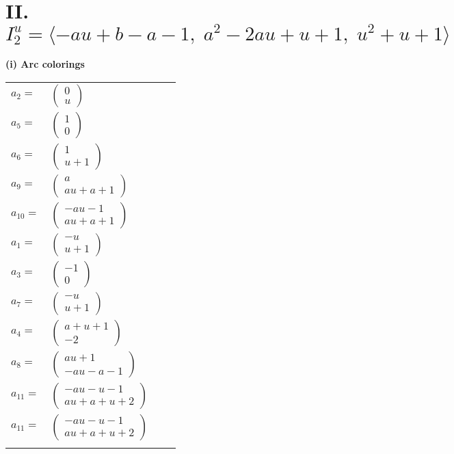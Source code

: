 \documentclass[1p]{elsarticle_modified}
\theoremstyle{definition}
\begin{document}
\centering \section*{II. $I^u_{2}= \langle - a u+b- a-1,\;a^2-2 a u+u+1,\;u^2+u+1 \rangle$}
\flushleft \textbf{(i) Arc colorings}\\
\begin{tabular}{m{7pt} m{180pt} m{7pt} m{180pt} }
\flushright $a_{2}=$&$\begin{pmatrix}0\\u\end{pmatrix}$ \\
\flushright $a_{5}=$&$\begin{pmatrix}1\\0\end{pmatrix}$ \\
\flushright $a_{6}=$&$\begin{pmatrix}1\\u+1\end{pmatrix}$ \\
\flushright $a_{9}=$&$\begin{pmatrix}a\\a u+a+1\end{pmatrix}$ \\
\flushright $a_{10}=$&$\begin{pmatrix}- a u-1\\a u+a+1\end{pmatrix}$ \\
\flushright $a_{1}=$&$\begin{pmatrix}- u\\u+1\end{pmatrix}$ \\
\flushright $a_{3}=$&$\begin{pmatrix}-1\\0\end{pmatrix}$ \\
\flushright $a_{7}=$&$\begin{pmatrix}- u\\u+1\end{pmatrix}$ \\
\flushright $a_{4}=$&$\begin{pmatrix}a+u+1\\-2\end{pmatrix}$ \\
\flushright $a_{8}=$&$\begin{pmatrix}a u+1\\- a u- a-1\end{pmatrix}$ \\
\flushright $a_{11}=$&$\begin{pmatrix}- a u- u-1\\a u+a+u+2\end{pmatrix}$\\ \flushright $a_{11}=$&$\begin{pmatrix}- a u- u-1\\a u+a+u+2\end{pmatrix}$\\&\end{tabular}
\end{document}
